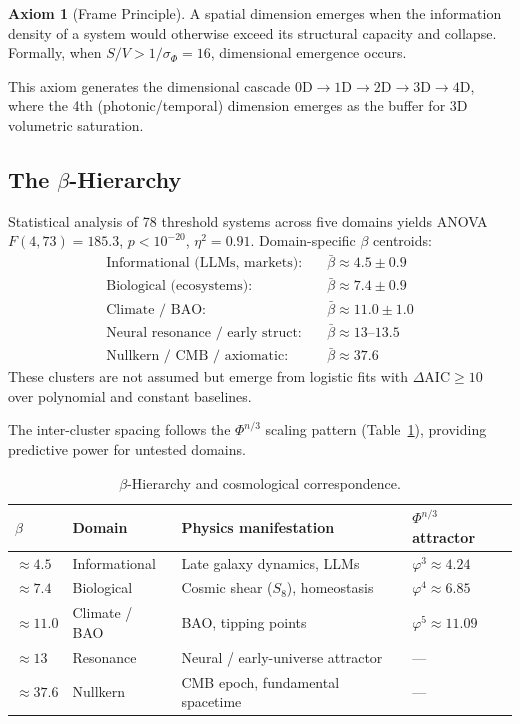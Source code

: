 \documentclass[12pt,a4paper]{article}
\theoremstyle{definition}
\newtheorem{axiom}{Axiom}
\newcommand{\sigphi}{\sigma_{\Phi}}
\newcommand{\phigold}{\varphi}   %
\newcommand{\PhiAFET}{\Phi}      %
\begin{document}
\begin{axiom}[Frame Principle]
A spatial dimension emerges when the information density of a system would
otherwise exceed its structural capacity and collapse.
Formally, when $S/V > 1/\sigphi = 16$, dimensional emergence occurs.
\end{axiom}

This axiom generates the dimensional cascade
$0\mathrm{D} \to 1\mathrm{D} \to 2\mathrm{D} \to 3\mathrm{D} \to 4\mathrm{D}$,
where the 4th (photonic/temporal) dimension emerges as the buffer for 3D
volumetric saturation.

\subsection{The $\beta$-Hierarchy}

\begin{validated}
Statistical analysis of 78 threshold systems across five domains yields
ANOVA $F(4,73) = 185.3$, $p < 10^{-20}$, $\eta^2 = 0.91$.
Domain-specific $\beta$ centroids:
\begin{align*}
  \text{Informational (LLMs, markets):} &\quad \bar\beta \approx 4.5\pm0.9 \\
  \text{Biological (ecosystems):}        &\quad \bar\beta \approx 7.4\pm0.9 \\
  \text{Climate / BAO:}                  &\quad \bar\beta \approx 11.0\pm1.0 \\
  \text{Neural resonance / early struct:}&\quad \bar\beta \approx 13\text{--}13.5 \\
  \text{Nullkern / CMB / axiomatic:}     &\quad \bar\beta \approx 37.6
\end{align*}
These clusters are not assumed but emerge from logistic fits with
$\Delta\mathrm{AIC} \geq 10$ over polynomial and constant baselines.
\end{validated}

The inter-cluster spacing follows the $\PhiAFET^{n/3}$ scaling pattern
(Table~\ref{tab:beta}), providing predictive power for untested domains.

\begin{table}[h]
\centering
\caption{$\beta$-Hierarchy and cosmological correspondence.}
\label{tab:beta}
\begin{tabular}{llll}
\toprule
$\beta$ & Domain & Physics manifestation & $\PhiAFET^{n/3}$ attractor \\
\midrule
$\approx 4.5$  & Informational & Late galaxy dynamics, LLMs & $\phigold^3 \approx 4.24$ \\
$\approx 7.4$  & Biological    & Cosmic shear ($S_8$), homeostasis & $\phigold^4 \approx 6.85$ \\
$\approx 11.0$ & Climate / BAO & BAO, tipping points & $\phigold^5 \approx 11.09$ \\
$\approx 13$   & Resonance     & Neural / early-universe attractor & --- \\
$\approx 37.6$ & Nullkern      & CMB epoch, fundamental spacetime & --- \\
\bottomrule
\end{tabular}
\end{table}
\end{document}
